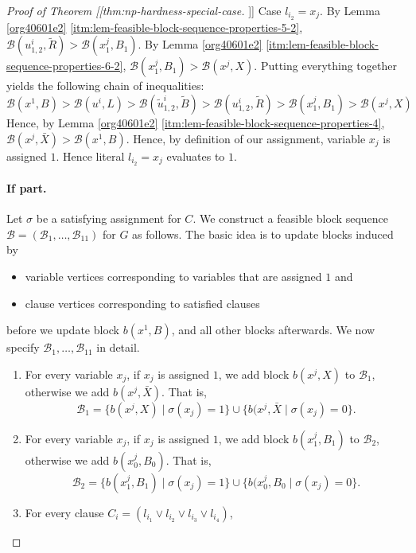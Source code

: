 \documentclass[fontsize=11pt,paper=a4]{book}
\begin{document}
\begin{proof}[Proof of Theorem [[thm:np-hardness-special-case]]]
Case \(l_{i_2}=x_j\).
By Lemma \ref{org40601e2} \ref{itm:lem-feasible-block-sequence-properties-5-2}, \(\mathcal{B}(u_{1,2}^i,\tilde{R})>\mathcal{B}(x_1^j,B_1)\).
By Lemma \ref{org40601e2} \ref{itm:lem-feasible-block-sequence-properties-6-2}, \(\mathcal{B}(x_1^j,B_1)>\mathcal{B}(x^j,X)\).
Putting everything together yields the following chain of inequalities:
\[
\mathcal{B}(x^1,B)>
\mathcal{B}(u^i,L)>
\mathcal{B}(\tilde{u}_{1,2}^i,\tilde{B})>
\mathcal{B}(u_{1,2}^i,\tilde{R})>
\mathcal{B}(x_1^j,B_1)>
\mathcal{B}(x^j,X)
\]
Hence, by Lemma \ref{org40601e2} \ref{itm:lem-feasible-block-sequence-properties-4}, \(\mathcal{B}(x^j,\bar{X})>\mathcal{B}(x^1,B)\).
Hence, by definition of our assignment, variable \(x_j\) is assigned \(1\).
Hence literal \(l_{i_2}=x_j\) evaluates to \(1\).

\paragraph{If part.}
Let \(\sigma\) be a satisfying assignment for \(C\).
We construct a feasible block sequence \(\mathcal{B}=(\mathscr{B}_1,\dots,\mathscr{B}_{11})\) for \(G\) as follows.
The basic idea is to update blocks induced by

\begin{itemize}
\item variable vertices corresponding to variables that are assigned \(1\) and

\item clause vertices corresponding to satisfied clauses
\end{itemize}


before we update block \(b(x^1,B)\), and all other blocks afterwards.
We now specify \(\mathscr{B}_1,\dots,\mathscr{B}_{11}\) in detail.

\begin{enumerate}
\item For every variable \(x_j\), if \(x_j\) is assigned \(1\), we add block \(b(x^j,X)\) to \(\mathscr{B}_1\), otherwise we add \(b(x^j,\bar{X})\).
That is,
\[
   \mathscr{B}_1=\{b(x^j,X)\mid\sigma(x_j)=1\}\cup\{b(x^j,\bar{X}\mid\sigma(x_j)=0\}.
   \]

\item For every variable \(x_j\), if \(x_j\) is assigned \(1\), we add block \(b(x_1^j,B_1)\) to \(\mathscr{B}_2\), otherwise we add \(b(x_0^j,B_0)\).
That is,
\[
   \mathscr{B}_2=\{b(x_1^j,B_1)\mid\sigma(x_j)=1\}\cup\{b(x_0^j,B_0\mid\sigma(x_j)=0\}.
   \]

\item For every clause \(C_i=(l_{i_1}\vee l_{i_2}\vee l_{i_3}\vee l_{i_4})\),


\end{enumerate}
\end{proof}
\end{document}
